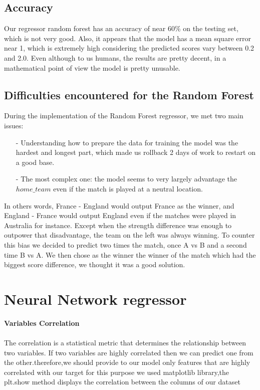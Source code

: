 \subsection{Accuracy}
Our regressor random forest has an accuracy of near 60\% on the testing set, which is not very good.
Also, it appears that the model has a mean square error near 1, which is extremely high considering the predicted scores vary between 0.2 and 2.0.
Even although to us humans, the results are pretty decent, in a mathematical point of view the model is pretty unusable.
\subsection{Difficulties encountered for the Random Forest}
During the implementation of the Random Forest regressor, we met two main issues:
 \begin{itemize}
    \item[-] Understanding how to prepare the data for training the model was the hardest and longest part, which made us rollback 2 days of work to restart on a good base.
    \item[-] The most complex one: the model seems to very largely advantage the $home\_team$ even if the match is played at a neutral location.

\end{itemize}
	In others words, France - England would output France as the winner, and England - France would output England even if the matches were played in Australia for instance.
	Except when the strength difference was enough to outpower that disadvantage, the team on the left was always winning.
	To counter this bias we decided to predict two times the match, once A vs B and a second time B vs A. We then chose as the winner the winner of the match which had the biggest score difference, we thought it was a good solution.
\newpage
\section{Neural Network regressor}


\textbf{Variables Correlation}\\
\\
The correlation is a statistical metric that determines the relationship between two variables. If two variables are highly correlated then we can predict one from the other.therefore,we should provide to our model only features that are highly correlated with our target
for this purpose we used matplotlib library,the plt.show method displays the correlation between the columns of our dataset

